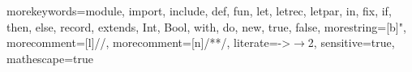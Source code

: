 {
	morekeywords={module, import, include, def, fun, let, letrec, letpar, in, fix,
	if, then, else, record, extends, Int, Bool, with, do, new, true, false},
	morestring=[b]", morecomment=[l]{//},
	morecomment=[n]{/*}{*/},
	literate={->}{$\rightarrow$}2,
  sensitive=true,
  mathescape=true
}


\newcommand{\lmrcode}[1]{\lstinline[language=LMR,basicstyle=\lstinlinestyle,breaklines=false]!#1!}
\newcommand{\lmrcodefig}[1]{\lstinline[language=LMR,basicstyle=\lstfigurestyle,breaklines=false]!#1!}
\newcommand{\lmrcodebl}[1]{\lstinline[language=LMR,basicstyle=\lstinlinestyle,breaklines=true]!#1!}
\newcommand{\LMR}{\langname{LMR}}
\newcommand{\lmrcodemm}[1]{\lstinline[language=LMR,basicstyle={\fontfamily{pcr}\fontsize{9pt}{11pt}\selectfont},breaklines=true]!#1!}

